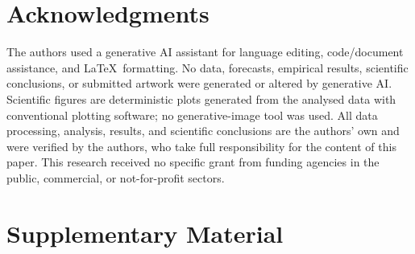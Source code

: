 \documentclass[3p,times]{elsarticle}
\begin{document}
\section*{Acknowledgments}
The authors used a generative AI assistant for language editing, code/document assistance, and \LaTeX\ formatting. No data, forecasts, empirical results, scientific conclusions, or submitted artwork were generated or altered by generative AI. Scientific figures are deterministic plots generated from the analysed data with conventional plotting software; no generative-image tool was used. All data processing, analysis, results, and scientific conclusions are the authors' own and were verified by the authors, who take full responsibility for the content of this paper.
This research received no specific grant from funding agencies in the public, commercial, or not-for-profit sectors.

{\footnotesize


}

\clearpage
\section*{Supplementary Material}

\end{document}

